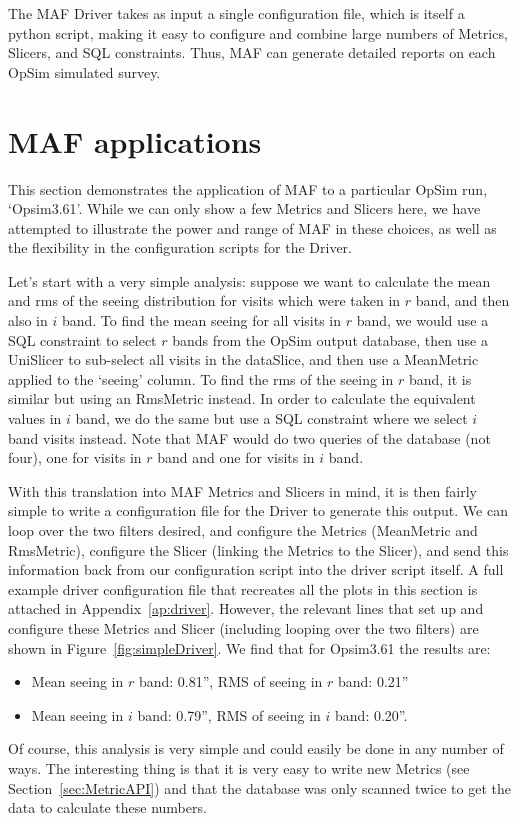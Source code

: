 \documentclass[]{spie}  %
\begin{document}
The MAF Driver takes as input a single configuration file, which is
itself a python script, making it easy to configure and combine large
numbers of Metrics, Slicers, and SQL constraints.  Thus, MAF can
generate detailed reports on each OpSim simulated survey.

\section{MAF applications}
\label{sec:examples}

This section demonstrates the application of MAF to a particular OpSim
run, `Opsim3.61'. While we can only show a few Metrics and Slicers
here, we have attempted to illustrate the power and range of MAF in
these choices, as well as the flexibility in the configuration scripts
for the Driver.

Let's start with a very simple analysis: suppose we want to calculate
the mean and rms of the seeing distribution for visits which were
taken in $r$ band, and then also in $i$ band. To find the mean seeing
for all visits in $r$ band, we would use a SQL constraint to select
$r$ bands from the OpSim output database, then use a UniSlicer to
sub-select all visits in the dataSlice, and then use a MeanMetric
applied to the `seeing' column. To find the rms of the seeing in $r$
band, it is similar but using an RmsMetric instead. In order to
calculate the equivalent values in $i$ band, we do the same but use a
SQL constraint where we select $i$ band visits instead. Note that MAF
would do two queries of the database (not four), one for visits in $r$
band and one for visits in $i$ band.

With this translation into MAF Metrics and Slicers in mind, it is then
fairly simple to write a configuration
file for the Driver to generate this output.  We can loop over the two
filters desired, and configure the Metrics (MeanMetric and RmsMetric),
configure the Slicer (linking the Metrics to the Slicer), and send
this information back from our configuration script into the driver
script itself. A full example driver
configuration file that recreates all the plots in this section is
attached in Appendix~\ref{ap:driver}.  However, the relevant lines
that set up and configure these Metrics and Slicer (including looping
over the two filters) are shown in Figure~\ref{fig:simpleDriver}. We
find that for Opsim3.61 the results are: 
\begin{itemize}
\item{Mean seeing in $r$ band: 0.81”, RMS of seeing in $r$ band: 0.21”}
\item{Mean seeing in $i$ band: 0.79”, RMS of seeing in $i$ band: 0.20”.}
\end{itemize}
Of course, this analysis is very simple and could easily be done in
any number of ways. The interesting thing is that it is very easy to
write new Metrics (see Section~\ref{sec:MetricAPI}) and that the
database was only scanned twice to get the data to calculate these
numbers. 
\end{document}
